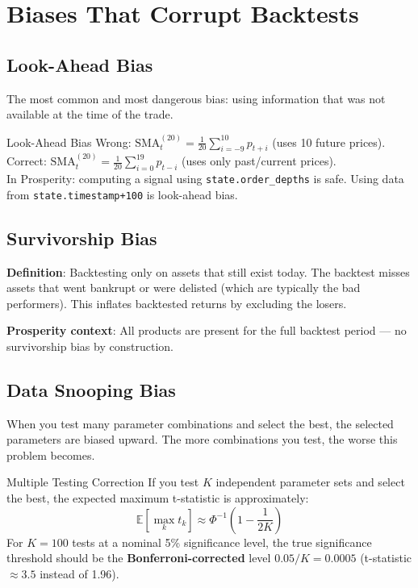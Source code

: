\documentclass[12pt,a4paper,openany]{report}
\theoremstyle{definition}
\newcommand{\E}{\mathbb{E}}
\begin{document}
\section{Biases That Corrupt Backtests}

\subsection{Look-Ahead Bias}

The most common and most dangerous bias: using information that was not available at the time of the trade.

\begin{examplebox}{Look-Ahead Bias}
Wrong: $\text{SMA}_t^{(20)} = \frac{1}{20}\sum_{i=-9}^{10} p_{t+i}$ (uses 10 future prices). \\
Correct: $\text{SMA}_t^{(20)} = \frac{1}{20}\sum_{i=0}^{19} p_{t-i}$ (uses only past/current prices). \\
In Prosperity: computing a signal using \texttt{state.order\_depths} is safe. Using data from \texttt{state.timestamp+100} is look-ahead bias.
\end{examplebox}

\subsection{Survivorship Bias}

\textbf{Definition}: Backtesting only on assets that still exist today. The backtest misses assets that went bankrupt or were delisted (which are typically the bad performers). This inflates backtested returns by excluding the losers.

\textbf{Prosperity context}: All products are present for the full backtest period — no survivorship bias by construction.

\subsection{Data Snooping Bias}

When you test many parameter combinations and select the best, the selected parameters are biased upward. The more combinations you test, the worse this problem becomes.

\begin{definitionbox}{Multiple Testing Correction}
If you test $K$ independent parameter sets and select the best, the expected maximum t-statistic is approximately:
\[
  \E[\max_k t_k] \approx \Phi^{-1}\!\left(1 - \frac{1}{2K}\right)
\]
For $K = 100$ tests at a nominal 5\% significance level, the true significance threshold should be the \textbf{Bonferroni-corrected} level $0.05/K = 0.0005$ (t-statistic $\approx 3.5$ instead of 1.96).
\end{definitionbox}
\end{document}
